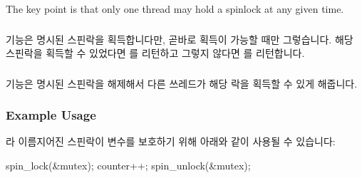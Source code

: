 The key point is that only one thread may hold a spinlock at any
given time.

\fi

\subsubsection{}

 기능은 명시된 스핀락을 획득합니다만, 곧바로 획득이 가능할
때만 그렇습니다.
해당 스핀락을 획득할 수 있었다면  를 리턴하고 그렇지 않다면 
를 리턴합니다.

\subsubsection{}

 기능은 명시된 스핀락을 해제해서 다른 쓰레드가 해당 락을
획득할 수 있게 해줍니다.

\subsubsection{Example Usage}

 라 이름지어진 스핀락이  변수를 보호하기 위해 아래와 같이
사용될 수 있습니다:

\begin{VerbatimU}
spin_lock(&mutex);
counter++;
spin_unlock(&mutex);
\end{VerbatimU}

